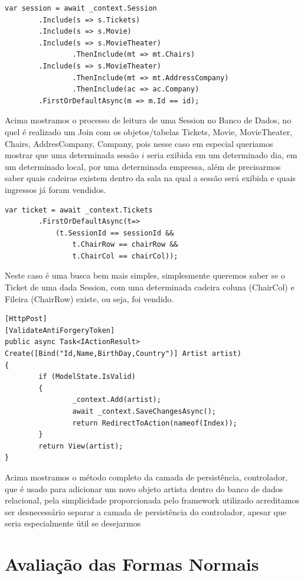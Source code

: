 \documentclass[a4paper,10pt]{article}
\begin{document}
\begin{lstlisting}
var session = await _context.Session
		.Include(s => s.Tickets)
		.Include(s => s.Movie)
		.Include(s => s.MovieTheater)
				.ThenInclude(mt => mt.Chairs)
		.Include(s => s.MovieTheater)
				.ThenInclude(mt => mt.AddressCompany)
				.ThenInclude(ac => ac.Company)
		.FirstOrDefaultAsync(m => m.Id == id);
\end{lstlisting}

Acima mostramos o processo de leitura de uma Session no Banco de Dados, no quel é realizado um Join com os objetos/tabelas Tickets, Movie, MovieTheater, Chairs, AddresCompany, Company, pois nesse caso em especial queriamos mostrar que uma determinada sessão $i$ seria exibida em um determinado dia, em um determinado local, por uma determinada empressa, além de precisarmos saber quais cadeiras existem dentro da sala na qual a sessão será exibida e quais ingressos já foram vendidos.

\begin{lstlisting}
var ticket = await _context.Tickets
		.FirstOrDefaultAsync(t=> 
			(t.SessionId == sessionId && 
				t.ChairRow == chairRow && 
				t.ChairCol == chairCol));
\end{lstlisting}

Neste caso é uma busca bem mais simples, simplesmente queremos saber se o Ticket de uma dada Session, com uma determinada cadeira coluna (ChairCol) e Fileira (ChairRow) existe, ou seja, foi vendido.

\begin{lstlisting}
[HttpPost]
[ValidateAntiForgeryToken]
public async Task<IActionResult> Create([Bind("Id,Name,BirthDay,Country")] Artist artist)
{
		if (ModelState.IsValid)
		{
				_context.Add(artist);
				await _context.SaveChangesAsync();
				return RedirectToAction(nameof(Index));
		}
		return View(artist);
}
\end{lstlisting}
Acima mostramos o método completo da camada de persistência, controlador, que é usado para adicionar um novo objeto artista dentro do banco de dados relacional, pela simplicidade proporcionada pelo framework utilizado acreditamos ser desnecessário separar a camada de persistência do controlador, apesar que seria especialmente útil se desejarmos 

\section{Avaliação das Formas Normais}

\end{document}

